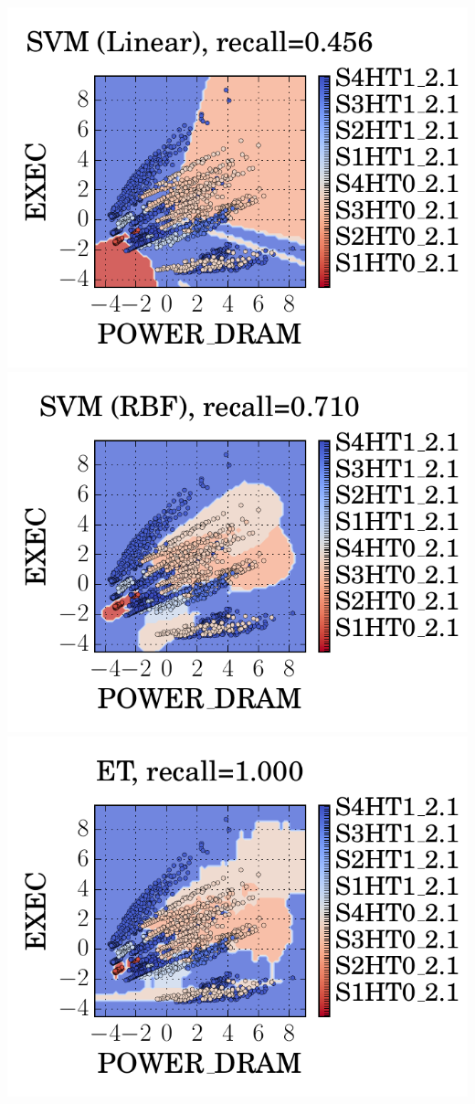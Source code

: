 \documentclass[a0,portrait]{a0poster}
\newcommand{\PAD}{\vskip 0.75cm}
\begin{document}
\begin{multicols}{2}
{
  \centering
  \includegraphics[]{figures/training_space_svm_kern_lin.pdf}
  \includegraphics[]{figures/training_space_svm.pdf}
  \includegraphics[]{figures/training_space_et.pdf}
  \label{fig:classifier-training}
\PAD
}


\end{multicols}
\end{document}
